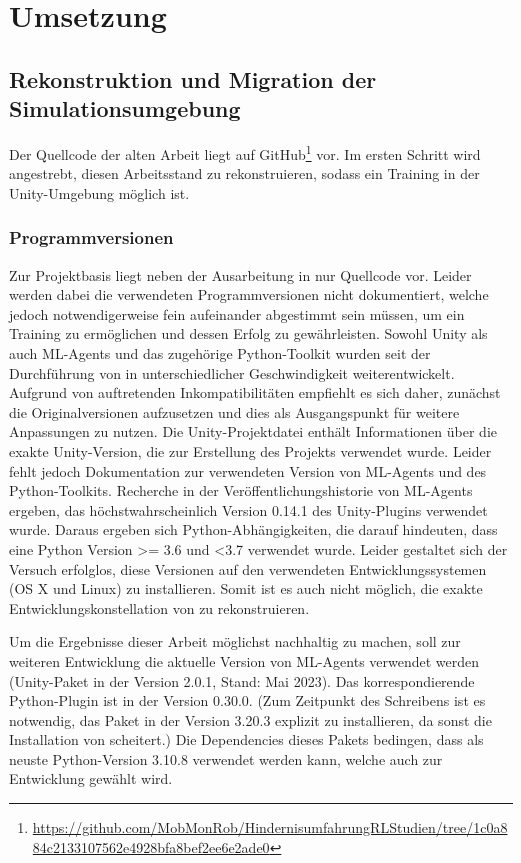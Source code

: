\chapter{Umsetzung}
\section{Rekonstruktion und Migration der Simulationsumgebung}
Der Quellcode der alten Arbeit liegt auf GitHub\footnote{\url{https://github.com/MobMonRob/HindernisumfahrungRLStudien/tree/1c0a884c2133107562e4928bfa8bef2ee6e2ade0}} vor.
Im ersten Schritt wird angestrebt, diesen Arbeitsstand zu rekonstruieren, sodass ein Training in der Unity-Umgebung möglich ist.

\subsection{Programmversionen}
Zur Projektbasis liegt neben der Ausarbeitung in \cite{waidner.2020} nur Quellcode vor.
Leider werden dabei die verwendeten Programmversionen nicht dokumentiert, welche jedoch notwendigerweise fein aufeinander abgestimmt sein müssen, um ein Training zu ermöglichen und dessen Erfolg zu gewährleisten.
Sowohl Unity als auch ML-Agents und das zugehörige Python-Toolkit wurden seit der Durchführung von \cite{waidner.2020} in unterschiedlicher Geschwindigkeit weiterentwickelt.
Aufgrund von auftretenden Inkompatibilitäten empfiehlt es sich daher, zunächst die Originalversionen aufzusetzen und dies als Ausgangspunkt für weitere Anpassungen zu nutzen.
Die Unity-Projektdatei enthält Informationen über die exakte Unity-Version, die zur Erstellung des Projekts verwendet wurde.
Leider fehlt jedoch Dokumentation zur verwendeten Version von ML-Agents und des Python-Toolkits.
Recherche in der Veröffentlichungshistorie von ML-Agents ergeben, das höchstwahrscheinlich Version 0.14.1 des Unity-Plugins verwendet wurde.
Daraus ergeben sich Python-Abhängigkeiten, die darauf hindeuten, dass eine Python Version \textgreater= 3.6 und \textless 3.7 verwendet wurde.
Leider gestaltet sich der Versuch erfolglos, diese Versionen auf den verwendeten Entwicklungssystemen (OS X und Linux) zu installieren.
Somit ist es auch nicht möglich, die exakte Entwicklungskonstellation von \cite{waidner.2020} zu rekonstruieren.

Um die Ergebnisse dieser Arbeit möglichst nachhaltig zu machen, soll zur weiteren Entwicklung die aktuelle Version von ML-Agents verwendet werden (Unity-Paket in der Version 2.0.1, Stand: Mai 2023).
Das korrespondierende Python-Plugin ist  in der Version 0.30.0.
(Zum Zeitpunkt des Schreibens ist es notwendig, das Paket  in der Version 3.20.3 explizit zu installieren, da sonst die Installation von  scheitert.)
Die Dependencies dieses Pakets bedingen, dass als neuste Python-Version 3.10.8 verwendet werden kann, welche auch zur Entwicklung gewählt wird.


